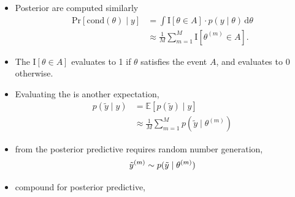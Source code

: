 \documentclass[10pt]{report}
\begin{document}
%
\begin{itemize}
\item Posterior  are computed similarly
\begin{align*}
\mbox{Pr}[\mbox{cond}(\theta) \mid y]
&=
\int \mathrm{I}[\theta \in A] \cdot p(y \mid \theta) \, \mathrm{d}\theta
\\
&\approx
\frac{1}{M} \sum_{m=1}^M \mathrm{I}[\theta^{(m)} \in A].
\end{align*}
%
\item The  $\mathrm{I}[\theta \in A]$ evaluates to 1 if $\theta$ satisfies the event $A$, and evaluates to 0 otherwise.
\end{itemize}

\begin{itemize}
\item Evaluating the  is another expectation,
%
\begin{align*}
p(\tilde{y} \mid y)
& = \mathbb{E}[p(\tilde{y}) \mid y]
\\
&\approx
\frac{1}{M} \sum_{m=1}^M p\left( \tilde{y} \mid \theta^{(m)} \right)
\end{align*}
%
\item {} from the posterior predictive requires random number generation,
  \[
    \tilde{y}^{(m)} \sim p(\tilde{y} \mid \theta^{(m)})
  \]
\item {} compound for posterior predictive,
\end{itemize}
\end{document}
